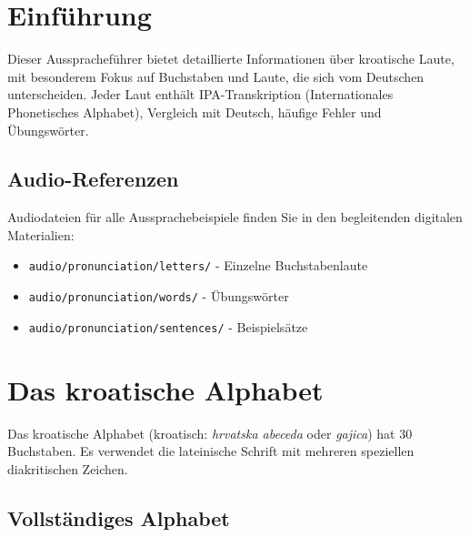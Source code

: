 
\section{Einführung}

Dieser Ausspracheführer bietet detaillierte Informationen über kroatische Laute, mit besonderem Fokus auf Buchstaben und Laute, die sich vom Deutschen unterscheiden. Jeder Laut enthält IPA-Transkription (Internationales Phonetisches Alphabet), Vergleich mit Deutsch, häufige Fehler und Übungswörter.

\subsection{Audio-Referenzen}

Audiodateien für alle Aussprachebeispiele finden Sie in den begleitenden digitalen Materialien:
\begin{itemize}
    \item \texttt{audio/pronunciation/letters/} - Einzelne Buchstabenlaute
    \item \texttt{audio/pronunciation/words/} - Übungswörter
    \item \texttt{audio/pronunciation/sentences/} - Beispielsätze
\end{itemize}

\section{Das kroatische Alphabet}

Das kroatische Alphabet (kroatisch: \textit{hrvatska abeceda} oder \textit{gajica}) hat 30 Buchstaben. Es verwendet die lateinische Schrift mit mehreren speziellen diakritischen Zeichen.

\subsection{Vollständiges Alphabet}

